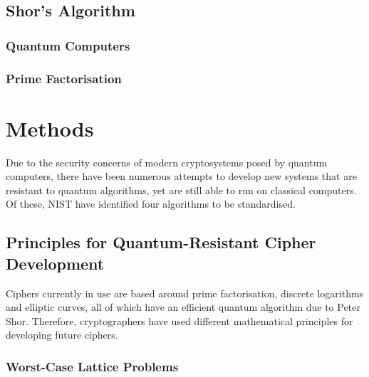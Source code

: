 \documentclass{article}
\begin{document}
\subsection{Shor's Algorithm}
\subsubsection{Quantum Computers}
\subsubsection{Prime Factorisation}

\section{Methods}
Due to the security concerns of modern cryptosystems posed by quantum
computers, there have been numerous attempts to develop new systems that are
resistant to quantum algorithms, yet are still able to run on classical
computers. Of these, NIST have identified four algorithms to be standardised.

\subsection{Principles for Quantum-Resistant Cipher Development}
Ciphers currently in use are based around prime factorisation, discrete
logarithms and elliptic curves, all of which have an efficient quantum
algorithm due to Peter Shor. Therefore, cryptographers have used different
mathematical principles for developing future ciphers.

\subsubsection{Worst-Case Lattice Problems}
\end{document}
